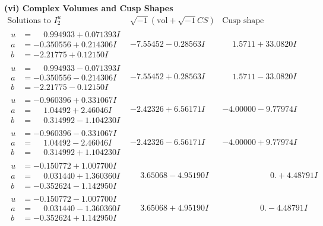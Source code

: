 \documentclass[1p]{elsarticle_modified}
\theoremstyle{definition}
\newcommand{\I}{\sqrt{-1}}
\begin{document}
\newpage\flushleft \textbf{(vi) Complex Volumes and Cusp Shapes}
$$\begin{array}{c|c|c}  
\text{Solutions to }I^u_{2}& \I (\text{vol} + \sqrt{-1}CS) & \text{Cusp shape}\\
 \hline 
\begin{aligned}
u &= \phantom{-}0.994933 + 0.071393 I \\
a &= -0.350556 + 0.214306 I \\
b &= -2.21775 + 0.12150 I\end{aligned}
 & -7.55452 - 0.28563 I & \phantom{-}1.5711 + 33.0820 I \\ \hline\begin{aligned}
u &= \phantom{-}0.994933 - 0.071393 I \\
a &= -0.350556 - 0.214306 I \\
b &= -2.21775 - 0.12150 I\end{aligned}
 & -7.55452 + 0.28563 I & \phantom{-}1.5711 - 33.0820 I \\ \hline\begin{aligned}
u &= -0.960396 + 0.331067 I \\
a &= \phantom{-}1.04492 + 2.46046 I \\
b &= \phantom{-}0.314992 - 1.104230 I\end{aligned}
 & -2.42326 + 6.56171 I & -4.00000 - 9.77974 I \\ \hline\begin{aligned}
u &= -0.960396 - 0.331067 I \\
a &= \phantom{-}1.04492 - 2.46046 I \\
b &= \phantom{-}0.314992 + 1.104230 I\end{aligned}
 & -2.42326 - 6.56171 I & -4.00000 + 9.77974 I \\ \hline\begin{aligned}
u &= -0.150772 + 1.007700 I \\
a &= \phantom{-}0.031440 + 1.360360 I \\
b &= -0.352624 - 1.142950 I\end{aligned}
 & \phantom{-}3.65068 - 4.95190 I & \phantom{-0.000000 -}0. + 4.48791 I \\ \hline\begin{aligned}
u &= -0.150772 - 1.007700 I \\
a &= \phantom{-}0.031440 - 1.360360 I \\
b &= -0.352624 + 1.142950 I\end{aligned}
 & \phantom{-}3.65068 + 4.95190 I & \phantom{-0.000000 } 0. - 4.48791 I \\ \hline\begin{aligned}

\end{aligned}
\end{array}$$
\end{document}

